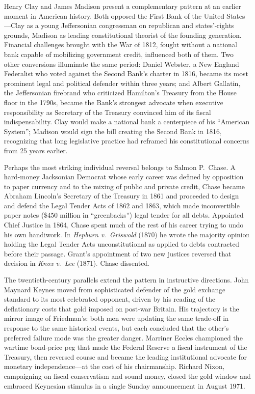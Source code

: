 \documentclass[12pt]{article}
\begin{document}
Henry Clay and James Madison present a complementary pattern at an
earlier moment in American history.  Both opposed the First Bank of the
United States---Clay as a young Jeffersonian congressman on republican
and states'-rights grounds, Madison as leading constitutional
theorist of the founding generation.  Financial challenges brought with the
War of 1812, fought without a national bank capable of mobilizing
government credit, influenced both of them.  Two other  conversions
illuminate the same period: Daniel Webster, a New England Federalist who
voted against the Second Bank's charter in 1816, became its most
prominent legal and political defender within three years; and Albert
Gallatin, the Jeffersonian firebrand who criticized Hamilton's Treasury
from the House floor in the 1790s, became the Bank's strongest advocate
when executive responsibility as Secretary of the Treasury convinced him of  its
fiscal indispensability.  Clay would make a national bank
a centerpiece of his ``American System''; Madison would sign the bill
creating the Second Bank in 1816, recognizing 
that long legislative practice had reframed his constitutional
concerns from 25 years earlier.

Perhaps the most striking individual reversal belongs to Salmon P.\ Chase.  A
hard-money Jacksonian Democrat whose early career was defined by
opposition to paper currency and to the mixing of public and private
credit, Chase became Abraham Lincoln's Secretary of the Treasury in 1861
and proceeded to design and defend the Legal Tender Acts of 1862 and
1863, which made inconvertible paper notes (\$450 million in
``greenbacks'') legal tender for all debts.  Appointed Chief Justice
in 1864, Chase spent much of the rest of his career trying to undo his own
handiwork.  In \textit{Hepburn v.\ Griswold} (1870) he wrote the
majority opinion holding the Legal Tender Acts unconstitutional as
applied to debts contracted before their passage.  Grant's appointment  of
two new justices reversed that decision in \textit{Knox v.\ Lee} (1871).
Chase dissented.

The twentieth-century parallels extend the pattern in instructive
directions.  John Maynard Keynes moved from sophisticated defender of
the gold exchange standard to its most celebrated opponent, driven by
his reading of the deflationary costs that gold imposed on post-war
Britain.  His trajectory is the mirror image of Friedman's: both men
were updating the same trade-off in response to the same historical
events, but each concluded that the other's preferred failure mode was
the greater danger.  Marriner Eccles championed the wartime bond-price
peg that made the Federal Reserve a fiscal instrument of the Treasury,
then reversed course and became the leading institutional advocate for
monetary independence---at the cost of his chairmanship.  Richard
Nixon, campaigning on fiscal conservatism and sound money, closed the
gold window and embraced Keynesian stimulus in a single Sunday
announcement in August 1971.
\end{document}
